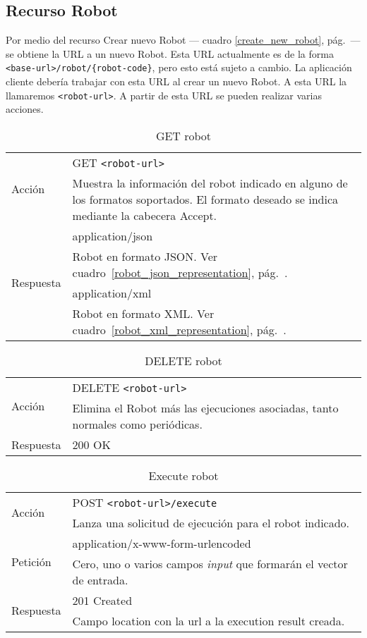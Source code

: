 \subsection{Recurso Robot}

Por medio del recurso Crear nuevo Robot --- cuadro
\ref{create_new_robot}, pág.~\pageref{create_new_robot}--- se obtiene
la URL a un nuevo Robot. Esta URL actualmente es de la forma
\verb+<base-url>/robot/{robot-code}+, pero esto está sujeto a
cambio. La aplicación cliente debería trabajar con esta URL al crear
un nuevo Robot. A esta URL la llamaremos \verb+<robot-url>+. A partir
de esta URL se pueden realizar varias acciones.

\begin{table}
\begin{tabularx}{\textwidth}{l X}
\multirow{2}{*}{Acción}
 & GET \verb+<robot-url>+ \\
 & Muestra la información del robot indicado en alguno de los formatos
soportados. El formato deseado se indica mediante la cabecera Accept.\\ \hline
\multirow{4}{*}{Respuesta}
& application/json \\
& Robot en formato JSON. Ver cuadro~\ref{robot_json_representation}, pág.~\pageref{robot_json_representation}. \\ \cline{2-2}
& application/xml \\
& Robot en formato XML. Ver cuadro~\ref{robot_xml_representation}, pág.~\pageref{robot_xml_representation}. \\
\end{tabularx}
\caption{GET robot}
\label{get_robot}
\end{table}

\begin{table}
\begin{tabularx}{\textwidth}{l X}
\multirow{2}{*}{Acción}
 & DELETE \verb+<robot-url>+ \\
 & Elimina el Robot más las ejecuciones asociadas, tanto normales como
periódicas.\\ \hline
\multirow{1}{*}{Respuesta}
& 200 OK \\
\end{tabularx}
\caption{DELETE robot}
\label{delete_robot}
\end{table}

\begin{table}
\begin{tabularx}{\textwidth}{l X}
\multirow{2}{*}{Acción}
 & POST \verb+<robot-url>/execute+ \\
 & Lanza una solicitud de ejecución para el robot indicado.\\ \hline
\multirow{2}{*}{Petición}
 & application/x-www-form-urlencoded \\
 & Cero, uno o varios campos \emph{input} que formarán el vector de entrada.\\ \hline
\multirow{2}{*}{Respuesta}
& 201 Created \\
& Campo location con la url a la execution result creada.\\
\end{tabularx}
\caption{Execute robot}
\label{execute_robot}
\end{table}

